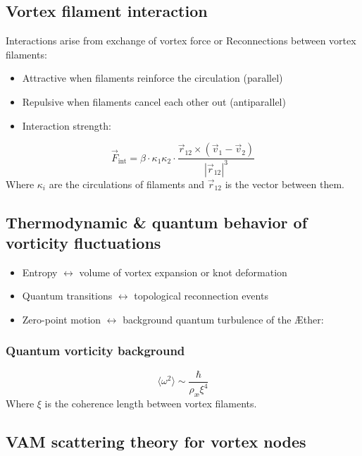 \subsection{Vortex filament interaction}
Interactions arise from exchange of vortex force or Reconnections between vortex filaments:
\begin{itemize}
    \item Attractive when filaments reinforce the circulation (parallel)
    \item Repulsive when filaments cancel each other out (antiparallel)
    \item Interaction strength:
\end{itemize}
\begin{equation}
    \vec{F}_\text{int} = \beta \cdot \kappa_1 \kappa_2 \cdot \frac{\vec{r}_{12} \times (\vec{v}_1 - \vec{v}_2)}{|\vec{r}_{12}|^3}\label{eq:interaction_strength}
\end{equation}
Where \(\kappa_i\) are the circulations of filaments and \(\vec{r}_{12}\) is the vector between them.

\subsection{Thermodynamic \& quantum behavior of vorticity fluctuations}
\begin{itemize}
    \item Entropy \(\leftrightarrow\) volume of vortex expansion or knot deformation
    \item Quantum transitions \(\leftrightarrow\) topological reconnection events
    \item Zero-point motion \(\leftrightarrow\) background quantum turbulence of the Æther:
\end{itemize}

\subsubsection*{Quantum vorticity background}
\begin{equation}
    \langle \omega^2 \rangle \sim \frac{\hbar}{\rho_\text{æ} \xi^4}\label{eq:quantum_vorticity_background}
\end{equation}
Where \(\xi\) is the coherence length between vortex filaments.

\subsection{VAM scattering theory for vortex nodes}

